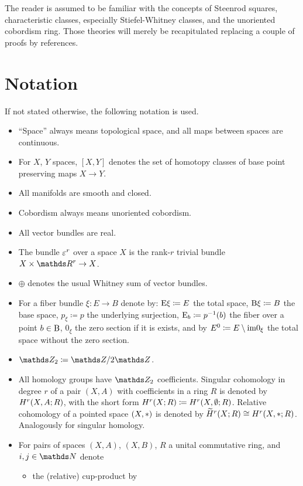 The reader is assumed to be familiar with the concepts of Steenrod
squares, characteristic classes, especially Stiefel-Whitney classes,
and the unoriented cobordism ring. Those theories will merely be
recapitulated replacing a couple of proofs by references.

\section*{Notation}
If not stated otherwise, the following notation is used.
\begin{itemize}
\item \enquote{Space} always means topological space, and all maps
  between spaces are continuous.
\item For $X$, $Y$ spaces, $[X,Y]$ denotes the set of homotopy classes
  of base point preserving maps $X\to Y$.
\item All manifolds are smooth and closed.
\item Cobordism always means unoriented cobordism.
\item All vector bundles are real.
\item The bundle $\varepsilon^r$ over a space $X$ is the rank-$r$ trivial
  bundle $X\times\R^r\to X$.
\item $\oplus$ denotes the usual Whitney sum of vector bundles.
\item For a fiber bundle $\xi\colon E\to B$ denote by:
  $\mathrm{E}\xi\coloneqq E$ the total space,
  $\mathrm{B}\xi\coloneqq B$ the base space,
  $p_\xi\coloneqq p$ the underlying surjection,
  $\mathrm{E}_b\coloneqq p^{-1}(b)$ the fiber over a point $b\in \B$,
  $0_\xi$ the zero section if it is exists, and by
  ${E}^0\coloneqq E\setminus\mathrm{im}0_{\xi}$
  the total space without the zero section.
\item $\Zmod2 \coloneqq \Z/2\Z$.
\item All homology groups have $\Zmod2$ coefficients. Singular
  cohomology in degree $r$ of a pair $(X,A)$ with 
  coefficients in a ring $R$ is denoted by $H^r(X,A;R)$, with the
  short form $H^r(X;R)\coloneqq H^r(X,\emptyset;R)$. Relative cohomology
  of a pointed space $(X,*)$ is denoted by
  $\widetilde{H}^r(X;R)\cong H^r(X,*;R)$.
  Analogously for singular homology.
\item For pairs of spaces $(X,A)$, $(X,B)$, $R$ a unital commutative
  ring, and $i,j\in\Nat$ denote
  \begin{itemize}
  \item the (relative) cup-product by
    \begin{align*}

\end{align*}
\end{itemize}
\end{itemize}
